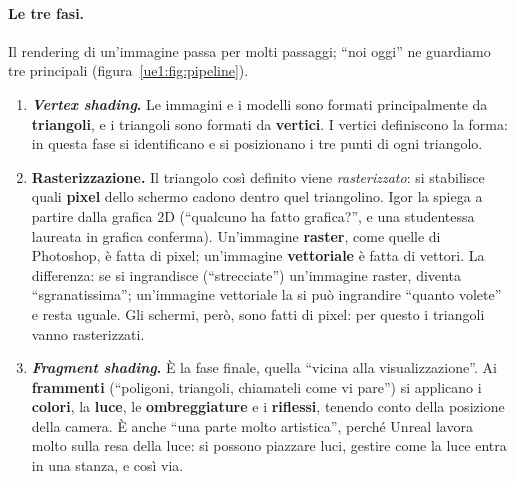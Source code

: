 \paragraph{Le tre fasi.} Il rendering di un'immagine passa per molti passaggi; ``noi oggi''
ne guardiamo tre principali (figura~\ref{ue1:fig:pipeline}).
\begin{enumerate}
  \item \textbf{\emph{Vertex shading}.} Le immagini e i modelli sono formati
        principalmente da \textbf{triangoli}, e i triangoli sono formati da
        \textbf{vertici}. I vertici definiscono la forma: in questa fase si
        identificano e si posizionano i tre punti di ogni triangolo.
  \item \textbf{Rasterizzazione.} Il triangolo così definito viene
        \emph{rasterizzato}: si stabilisce quali \textbf{pixel} dello schermo cadono
        dentro quel triangolino. Igor la spiega a partire dalla grafica 2D (``qualcuno
        ha fatto grafica?'', e una studentessa laureata in grafica conferma). Un'immagine
        \textbf{raster}, come quelle di Photoshop, è fatta di pixel; un'immagine
        \textbf{vettoriale} è fatta di vettori. La differenza: se si ingrandisce
        (``strecciate'') un'immagine raster, diventa ``sgranatissima''; un'immagine
        vettoriale la si può ingrandire ``quanto volete'' e resta uguale. Gli schermi,
        però, sono fatti di pixel: per questo i triangoli vanno rasterizzati.
  \item \textbf{\emph{Fragment shading}.} È la fase finale, quella ``vicina alla
        visualizzazione''. Ai \textbf{frammenti} (``poligoni, triangoli, chiamateli
        come vi pare'') si applicano i \textbf{colori}, la \textbf{luce}, le
        \textbf{ombreggiature} e i \textbf{riflessi}, tenendo conto della posizione
        della camera. È anche ``una parte molto artistica'', perché Unreal lavora molto
        sulla resa della luce: si possono piazzare luci, gestire come la luce entra in
        una stanza, e così via.
\end{enumerate}

